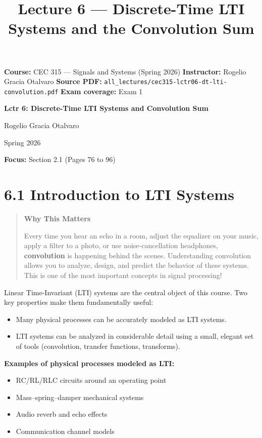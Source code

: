 \documentclass[11pt]{article}
\title{Lecture 6 — Discrete-Time LTI Systems and the Convolution Sum}
\author{}
\date{}
\begin{document}
\maketitle

\textbf{Course:} CEC 315 — Signals and Systems (Spring 2026)
\textbf{Instructor:} Rogelio Gracia Otalvaro
\textbf{Source PDF:} \texttt{all\_lectures/cec315-lctr06-dt-lti-convolution.pdf}
\textbf{Exam coverage:} Exam 1

\textbf{Lctr 6: Discrete-Time LTI Systems and Convolution Sum}

Rogelio Gracia Otalvaro

Spring 2026

\textbf{Focus:} Section 2.1 (Pages 76 to 96)

\section*{6.1 Introduction to LTI Systems}

\begin{quote}
\textbf{Why This Matters}

Every time you hear an echo in a room, adjust the equalizer on your music, apply a filter to a photo, or use noise-cancellation headphones, \textbf{convolution} is happening behind the scenes. Understanding convolution allows you to analyze, design, and predict the behavior of these systems. This is one of the most important concepts in signal processing!
\end{quote}

Linear Time-Invariant (LTI) systems are the central object of this course. Two key properties make them fundamentally useful:

\begin{itemize}
  \item Many physical processes can be accurately modeled as LTI systems.
  \item LTI systems can be analyzed in considerable detail using a small, elegant set of tools (convolution, transfer functions, transforms).
\end{itemize}

\textbf{Examples of physical processes modeled as LTI:}

\begin{itemize}
  \item RC/RL/RLC circuits around an operating point
  \item Mass–spring–damper mechanical systems
  \item Audio reverb and echo effects
  \item Communication channel models
\end{itemize}
\end{document}
